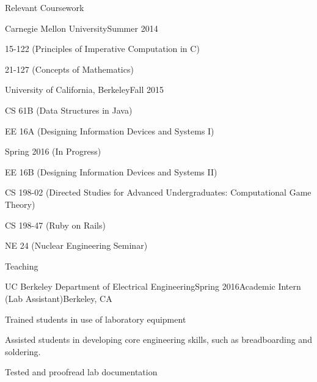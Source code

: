 \documentclass{resume} %
\begin{document}
\pagebreak

\begin{rSection}{Relevant Coursework}

\begin{rSubsection}{Carnegie Mellon University}{}{Summer 2014}{}
\item 15-122 (Principles of Imperative Computation in C)
\item 21-127 (Concepts of Mathematics)
\end{rSubsection}

\begin{rSubsection}{University of California, Berkeley}{}{Fall 2015}{}
\item CS 61B (Data Structures in Java)
\item EE 16A (Designing Information Devices and Systems I)
\end{rSubsection}
\begin{rSubsection}{}{}{Spring 2016 (In Progress)}{}
\item EE 16B (Designing Information Devices and Systems II)
\item CS 198-02 (Directed Studies for Advanced Undergraduates: Computational Game Theory)
\item CS 198-47 (Ruby on Rails)
\item NE 24 (Nuclear Engineering Seminar)
\end{rSubsection}

\end{rSection}

\begin{rSection}{Teaching}
\begin{rSubsection}{UC Berkeley Department of Electrical Engineering}{Spring 2016}{Academic Intern (Lab Assistant)}{Berkeley, CA}
\item Trained students in use of laboratory equipment
\item Assisted students in developing core engineering skills, such as breadboarding and soldering.
\item Tested and proofread lab documentation
\end{rSubsection}
\end{rSection}






\end{document}
